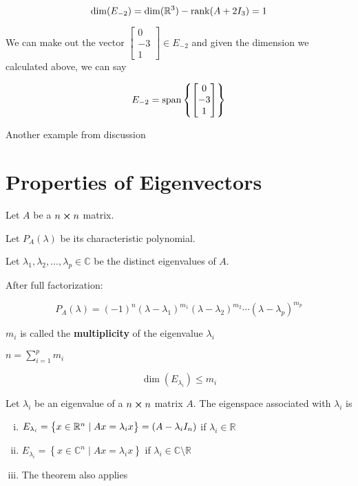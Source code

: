 \begin{sol}
	\[\dim(E_{-2}) = \dim(\mathbb{R}^3) - \rank(A + 2 I_3) = 1\]

	We can make out the vector $\begin{bmatrix}
		0\\-3\\1
	\end{bmatrix} \in E_{-2}$ and given the dimension we calculated above, we can say

	\[E_{-2} = \mathrm{span}\left\{\begin{bmatrix}
		0\\-3\\1
	\end{bmatrix}\right\}\]
\end{sol}

\begin{example}
	Another example from discussion
\end{example}

\section{Properties of Eigenvectors}

Let $A$ be a $n\cross n$ matrix.

Let $P_A(\lambda)$ be its characteristic polynomial.

Let $\lambda_1, \lambda_2, \ldots, \lambda_p \in \mathbb{C}$ be the distinct eigenvalues of $A$.

After full factorization:

\[P_A(\lambda) = (-1)^n (\lambda - \lambda_1)^{m_1} (\lambda - \lambda_2)^{m_2} \cdots (\lambda - \lambda_p)^{m_p}\]

$m_i$ is called the \textbf{multiplicity} of the eigenvalue $\lambda_i$

\begin{remark}
	$n = \sum_{i=1}^{p} m_i$
\end{remark}

\begin{theorem}
	\[\dim(E_{\lambda_i}) \leq m_i\]
\end{theorem}

\begin{definition}
	Let $\lambda_i$ be an eigenvalue of a $n\cross n$ matrix $A$. The eigenspace associated with $\lambda_i$ is

	\begin{enumerate}[i)]
		\item $E_{\lambda_i} = \left\{x \in \mathbb{R}^n \mid Ax = \lambda_i x\right\} = \null(A - \lambda_i I_n)$ if $\lambda_i \in \mathbb{R}$
		\item $E_{\lambda_i} = \left\{x \in \mathbb{C}^n \mid Ax = \lambda_i x\right\} $ if $\lambda_i \in \mathbb{C} \setminus \mathbb{R}$
		\item The theorem also applies
	\end{enumerate}

\end{definition}

